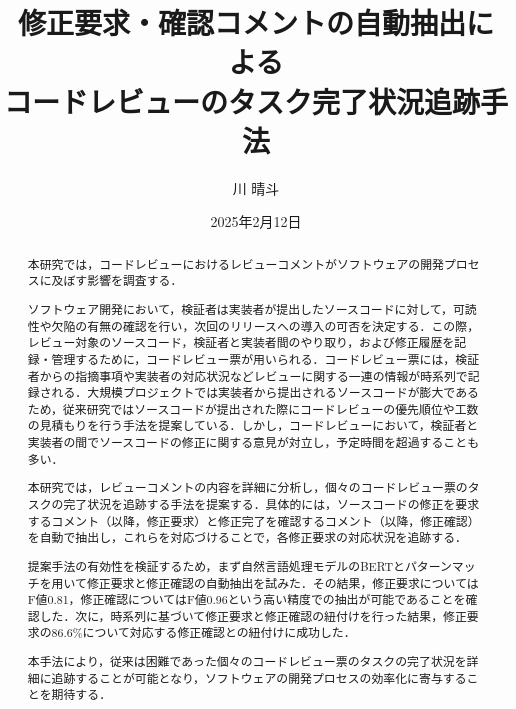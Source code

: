 \documentclass[11pt]{jreport}
\title{修正要求・確認コメントの自動抽出による\\
コードレビューのタスク完了状況追跡手法}
\author{川\UTF{FA11} 晴斗}
\date{2025年2月12日}
\begin{document}
\maketitle


\begin{abstract}
本研究では，コードレビューにおけるレビューコメントがソフトウェアの開発プロセスに及ぼす影響を調査する．

ソフトウェア開発において，検証者は実装者が提出したソースコードに対して，可読性や欠陥の有無の確認を行い，次回のリリースへの導入の可否を決定する．この際，レビュー対象のソースコード，検証者と実装者間のやり取り，および修正履歴を記録・管理するために，コードレビュー票が用いられる．コードレビュー票には，検証者からの指摘事項や実装者の対応状況などレビューに関する一連の情報が時系列で記録される．大規模プロジェクトでは実装者から提出されるソースコードが膨大であるため，従来研究ではソースコードが提出された際にコードレビューの優先順位や工数の見積もりを行う手法を提案している．しかし，コードレビューにおいて，検証者と実装者の間でソースコードの修正に関する意見が対立し，予定時間を超過することも多い．

本研究では，レビューコメントの内容を詳細に分析し，個々のコードレビュー票のタスクの完了状況を追跡する手法を提案する．具体的には，ソースコードの修正を要求するコメント（以降，修正要求）と修正完了を確認するコメント（以降，修正確認）を自動で抽出し，これらを対応づけることで，各修正要求の対応状況を追跡する．

提案手法の有効性を検証するため，まず自然言語処理モデルのBERTとパターンマッチを用いて修正要求と修正確認の自動抽出を試みた．その結果，修正要求についてはF値0.81，修正確認についてはF値0.96という高い精度での抽出が可能であることを確認した．次に，時系列に基づいて修正要求と修正確認の紐付けを行った結果，修正要求の86.6\%について対応する修正確認との紐付けに成功した．

本手法により，従来は困難であった個々のコードレビュー票のタスクの完了状況を詳細に追跡することが可能となり，ソフトウェアの開発プロセスの効率化に寄与することを期待する．
\end{abstract}

\tableofcontents

\newpage
{}	%



\end{document}
